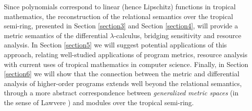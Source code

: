 Since polynomials correspond to linear (hence Lipschitz) functions in tropical mathematics, the reconstruction of the relational semantics over the tropical semi-ring, presented in Section \ref{section3} and Section \ref{section4}, will provide a metric semantics of the differential $\lambda$-calculus, bridging sensitivity and resource analysis. 
In Section \ref{section5} we will suggest potential applications of this approach, relating well-studied applications of program metrics, resource analysis with current uses of tropical mathematics in computer science.  
Finally, in Section \ref{section6} we will show that the connection between the metric and differential analysis of higher-order programs extends well beyond the relational semantics, through a more abstract correspondence between  
\emph{generalized metric spaces} (in the sense of Lawvere \cite{}) and modules over the tropical semi-ring.










